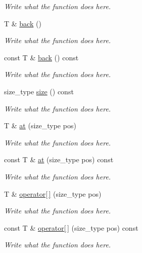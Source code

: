 \begin{DoxyCompactItemize}
\begin{DoxyCompactList}\small\item\em Write what the function does here. \end{DoxyCompactList}\item 
T \& \hyperlink{classcircularDeque_ac69176f819e11b48102c9d8d437bce1f}{back} ()
\begin{DoxyCompactList}\small\item\em Write what the function does here. \end{DoxyCompactList}\item 
const T \& \hyperlink{classcircularDeque_adff664efac328874c847f2ee0ec90e8d}{back} () const 
\begin{DoxyCompactList}\small\item\em Write what the function does here. \end{DoxyCompactList}\item 
size\+\_\+type \hyperlink{classcircularDeque_af2322b6806ac718aa6d87707eeef48cc}{size} () const 
\begin{DoxyCompactList}\small\item\em Write what the function does here. \end{DoxyCompactList}\item 
T \& \hyperlink{classcircularDeque_af0eb4485a700a96801a8eca42e8a2dc0}{at} (size\+\_\+type pos)
\begin{DoxyCompactList}\small\item\em Write what the function does here. \end{DoxyCompactList}\item 
const T \& \hyperlink{classcircularDeque_ad4639709e34d0fe22aec439b1a49fc64}{at} (size\+\_\+type pos) const 
\begin{DoxyCompactList}\small\item\em Write what the function does here. \end{DoxyCompactList}\item 
T \& \hyperlink{classcircularDeque_a501209c577d05b9600f584695301fb4f}{operator\mbox{[}$\,$\mbox{]}} (size\+\_\+type pos)
\begin{DoxyCompactList}\small\item\em Write what the function does here. \end{DoxyCompactList}\item 
const T \& \hyperlink{classcircularDeque_a30e6ad84208bcbaba30732df01c28183}{operator\mbox{[}$\,$\mbox{]}} (size\+\_\+type pos) const 
\begin{DoxyCompactList}\small\item\em Write what the function does here. \end{DoxyCompactList}\item 

\end{DoxyCompactItemize}
